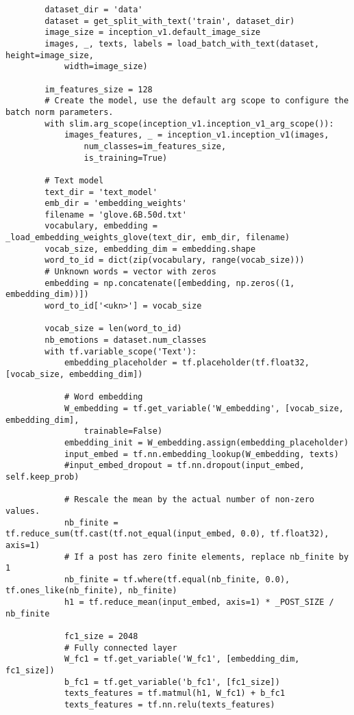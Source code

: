 \begin{lstlisting}
        dataset_dir = 'data'
        dataset = get_split_with_text('train', dataset_dir)
        image_size = inception_v1.default_image_size
        images, _, texts, labels = load_batch_with_text(dataset, height=image_size, 
            width=image_size)
        
        im_features_size = 128
        # Create the model, use the default arg scope to configure the batch norm parameters.
        with slim.arg_scope(inception_v1.inception_v1_arg_scope()):
            images_features, _ = inception_v1.inception_v1(images, 
                num_classes=im_features_size, 
                is_training=True)

        # Text model
        text_dir = 'text_model'
        emb_dir = 'embedding_weights'
        filename = 'glove.6B.50d.txt'
        vocabulary, embedding = _load_embedding_weights_glove(text_dir, emb_dir, filename)
        vocab_size, embedding_dim = embedding.shape
        word_to_id = dict(zip(vocabulary, range(vocab_size)))
        # Unknown words = vector with zeros
        embedding = np.concatenate([embedding, np.zeros((1, embedding_dim))])
        word_to_id['<ukn>'] = vocab_size

        vocab_size = len(word_to_id)
        nb_emotions = dataset.num_classes
        with tf.variable_scope('Text'):
            embedding_placeholder = tf.placeholder(tf.float32, [vocab_size, embedding_dim])
        
            # Word embedding
            W_embedding = tf.get_variable('W_embedding', [vocab_size, embedding_dim], 
                trainable=False)
            embedding_init = W_embedding.assign(embedding_placeholder)
            input_embed = tf.nn.embedding_lookup(W_embedding, texts)
            #input_embed_dropout = tf.nn.dropout(input_embed, self.keep_prob)

            # Rescale the mean by the actual number of non-zero values.
            nb_finite = tf.reduce_sum(tf.cast(tf.not_equal(input_embed, 0.0), tf.float32), axis=1)
            # If a post has zero finite elements, replace nb_finite by 1
            nb_finite = tf.where(tf.equal(nb_finite, 0.0), tf.ones_like(nb_finite), nb_finite)
            h1 = tf.reduce_mean(input_embed, axis=1) * _POST_SIZE / nb_finite

            fc1_size = 2048
            # Fully connected layer
            W_fc1 = tf.get_variable('W_fc1', [embedding_dim, fc1_size])
            b_fc1 = tf.get_variable('b_fc1', [fc1_size])
            texts_features = tf.matmul(h1, W_fc1) + b_fc1
            texts_features = tf.nn.relu(texts_features)


\end{lstlisting}

